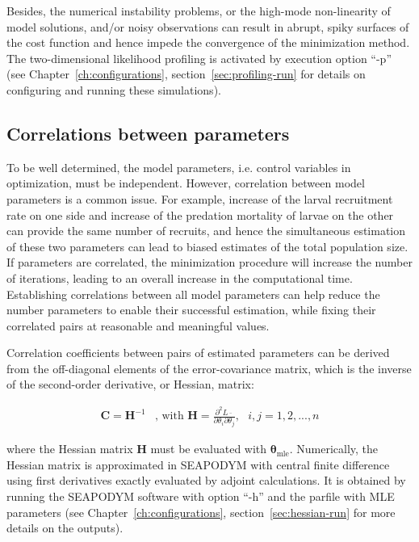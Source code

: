 Besides, the numerical instability problems, or the high-mode non-linearity of model solutions, and/or noisy observations can result in abrupt, spiky surfaces of the cost function and hence impede the convergence of the minimization method. The two-dimensional likelihood profiling is activated by execution option ``-p'' (see Chapter~\ref{ch:configurations}, section~\ref{sec:profiling-run} for details on configuring and running these simulations).

\subsection{Correlations between parameters}\label{sec:par-correlations}

To be well determined, the model parameters, i.e. control variables in optimization, must be independent. However, correlation between model parameters is a common issue. For example, increase of the larval recruitment rate on one side and increase of the predation mortality of larvae on the other can provide the same number of recruits, and hence the simultaneous estimation of these two parameters can lead to biased estimates of the total population size. If parameters are correlated, the minimization procedure will increase the number of iterations, leading to an overall increase in the computational time. Establishing correlations between all model parameters can help reduce the number parameters to enable their successful estimation, while fixing their correlated pairs at reasonable and meaningful values.

Correlation coefficients between pairs of estimated parameters can be derived from the off-diagonal elements of the error-covariance matrix, which is the inverse of the second-order derivative, or Hessian, matrix:

\begin{align}\label{eq:covarmat} 
\mathbf{C}=\mathbf {H}^{-1} & \mbox{, with } \mathbf H=\frac{\partial^2 L\bar{\text{ }}}{\partial \theta_i \partial\theta_j}, \text{ } i,j=1,2,...,n
\end{align}

\noindent where the Hessian matrix $\mathbf{H}$ must be evaluated with $\boldsymbol\theta_{\text{mle}}$. Numerically, the Hessian matrix is approximated in SEAPODYM with central finite difference using first derivatives exactly evaluated by adjoint calculations. It is obtained by running the SEAPODYM software with option ``-h'' and the parfile with MLE parameters (see Chapter~\ref{ch:configurations}, section~\ref{sec:hessian-run} for more details on the outputs). 

